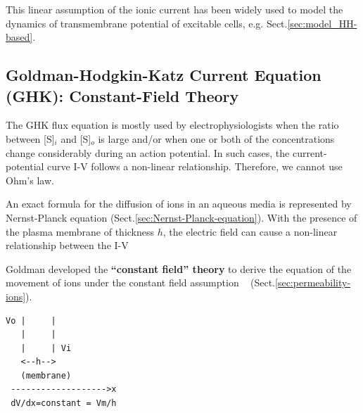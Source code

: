 This linear assumption of the ionic current has been widely used to model the
dynamics of transmembrane potential of excitable cells, e.g.
Sect.\ref{sec:model_HH-based}.










\subsection{Goldman-Hodgkin-Katz Current Equation (GHK):
Constant-Field Theory}
\label{sec:constant-field-theory}
\label{sec:GHK_current}
\label{sec:GHK_flux}

\begin{mdframed}
The GHK flux equation is mostly used by electrophysiologists when the ratio
between [S]$_i$ and [S]$_o$ is large and/or when one or both of the
concentrations change considerably during an action potential.
In such cases, the current-potential curve I-V follows a non-linear
relationship. Therefore, we cannot use Ohm's law.
\end{mdframed}

An exact formula for the diffusion of ions in an aqueous media is represented by
Nernst-Planck equation (Sect.\ref{sec:Nernst-Planck-equation}). With the
presence of the plasma membrane of thickness $h$, the electric field can
cause a non-linear relationship between the I-V

Goldman developed the {\bf ``constant field'' theory} to derive the equation of
the movement of ions under the constant field assumption
~\citep{goldman1943pir} (Sect.\ref{sec:permeability-ions}).
\begin{verbatim}
Vo |     |
   |     |
   |     | Vi
   <--h-->
   (membrane)
 ------------------->x
 dV/dx=constant = Vm/h
\end{verbatim}


